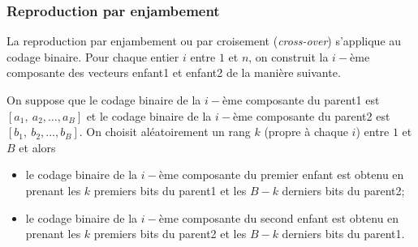 \subsubsection{Reproduction par enjambement}

La reproduction par enjambement ou par croisement (\textit{cross-over}) s'applique au codage binaire. Pour chaque entier $i$ entre $1$ et $n$, on construit la $i-$ème composante des vecteurs enfant1 et enfant2 de la manière suivante.

On suppose que le codage binaire de la $i-$ème composante du parent1 est $[a_1,~a_2,\ldots, a_B]$ et le codage binaire de la $i-$ème composante du parent2 est $[b_1,~b_2,\ldots, b_B]$. On choisit aléatoirement un rang $k$ (propre à chaque $i$) entre $1$ et $B$ et alors
\begin{itemize}
	\item le codage binaire de la $i-$ème composante du premier \og enfant \fg{} est obtenu en prenant les $k$ premiers bits du parent1 et les $B-k$ derniers bits du parent2;
	\item le codage binaire de la $i-$ème composante du second \og enfant \fg{} est obtenu en prenant les $k$ premiers bits du parent2 et les $B-k$ derniers bits du parent1.
\end{itemize}

